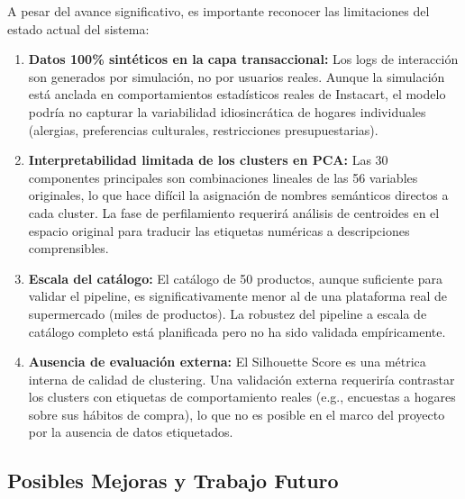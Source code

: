 \documentclass[12pt,a4paper]{article}
\begin{document}
A pesar del avance significativo, es importante reconocer las limitaciones del estado actual del sistema:

\begin{enumerate}
    \item \textbf{Datos 100\% sintéticos en la capa transaccional:} Los logs de interacción son generados por simulación, no por usuarios reales. Aunque la simulación está anclada en comportamientos estadísticos reales de Instacart, el modelo podría no capturar la variabilidad idiosincrática de hogares individuales (alergias, preferencias culturales, restricciones presupuestarias).

    \item \textbf{Interpretabilidad limitada de los clusters en PCA:} Las 30 componentes principales son combinaciones lineales de las 56 variables originales, lo que hace difícil la asignación de nombres semánticos directos a cada cluster. La fase de perfilamiento requerirá análisis de centroides en el espacio original para traducir las etiquetas numéricas a descripciones comprensibles.

    \item \textbf{Escala del catálogo:} El catálogo de 50 productos, aunque suficiente para validar el pipeline, es significativamente menor al de una plataforma real de supermercado (miles de productos). La robustez del pipeline a escala de catálogo completo está planificada pero no ha sido validada empíricamente.

    \item \textbf{Ausencia de evaluación externa:} El Silhouette Score es una métrica interna de calidad de clustering. Una validación externa requeriría contrastar los clusters con etiquetas de comportamiento reales (e.g., encuestas a hogares sobre sus hábitos de compra), lo que no es posible en el marco del proyecto por la ausencia de datos etiquetados.
\end{enumerate}

\subsection{Posibles Mejoras y Trabajo Futuro}
\end{document}
